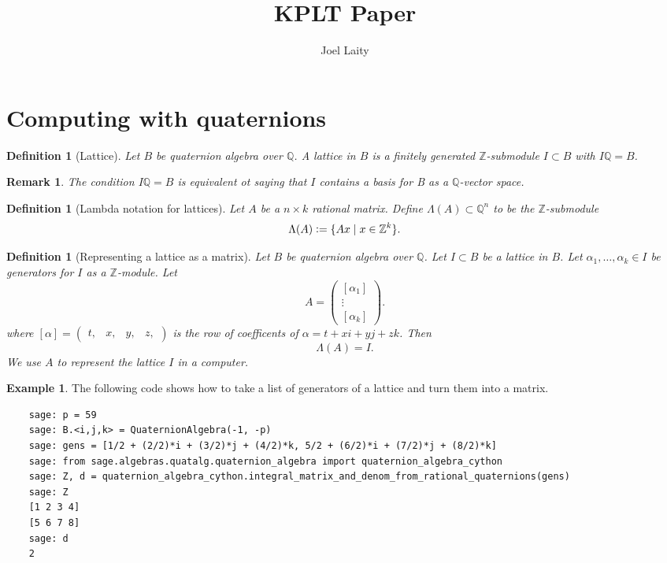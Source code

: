 \documentclass[10pt]{article}
\title{KPLT Paper}
\author{Joel Laity}
\theoremstyle{plain}
\newtheorem{remark}[theorem]{Remark}
\newtheorem{definition}[theorem]{Definition}
\theoremstyle{definition}
\newtheorem{example}[theorem]{Example}
\newcommand{\Z}{\mathbb{Z}}
\newcommand{\Q}{\mathbb{Q}}
\begin{document}
\maketitle
\tableofcontents

\section{Computing with quaternions}

\begin{definition}[Lattice]
    Let \( B \) be quaternion algebra over \( \Q \).
    A \emph{lattice} in \( B \) is a finitely generated \( \Z \)-submodule \( I \subset B \) with \( I\Q = B \).
\end{definition}

\begin{remark}
    The condition \( I\Q = B \) is equivalent ot saying that \( I \) contains a basis for B as a \( \Q \)-vector space.
\end{remark}

\begin{definition}[Lambda notation for lattices]
    Let \( A \) be a \( n \times k \) rational matrix.
    Define \( \Lambda(A) \subset \Q^n \) to be the \( \Z \)-submodule
    \[
        \Lambda(A) \vcentcolon = \{ Ax \mid x \in \Z^k \}.
    \]
\end{definition}

\begin{definition}[Representing a lattice as a matrix]
    Let \( B \) be quaternion algebra over \( \Q \).
    Let \( I \subset B \) be a lattice in \( B \).
    Let \( \alpha_1, \dots , \alpha_k \in I\) be generators for \( I \) as a \( \Z \)-module.
    Let
    \[
        A =
        \begin{pmatrix}
            [\alpha_1] \\  \vdots \\ [\alpha_k]
        \end{pmatrix}.
    \]
    where \( [\alpha] =  \begin{pmatrix} t, & x, & y, & z, \end{pmatrix} \) is the row of coefficents of \( \alpha = t + xi + yj + zk \).
    Then
    \[
        \Lambda(A) = I.
    \]
    We use \( A \) to represent the lattice \( I \) in a computer.
\end{definition}


\begin{example}
    The following code shows how to take a list of generators of a lattice and turn them into a matrix.
    \begin{lstlisting}
    sage: p = 59
    sage: B.<i,j,k> = QuaternionAlgebra(-1, -p)
    sage: gens = [1/2 + (2/2)*i + (3/2)*j + (4/2)*k, 5/2 + (6/2)*i + (7/2)*j + (8/2)*k]
    sage: from sage.algebras.quatalg.quaternion_algebra import quaternion_algebra_cython
    sage: Z, d = quaternion_algebra_cython.integral_matrix_and_denom_from_rational_quaternions(gens)
    sage: Z
    [1 2 3 4]
    [5 6 7 8]
    sage: d
    2
  \end{lstlisting}
\end{example}
\end{document}
